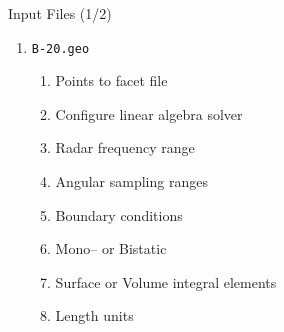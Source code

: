 
\begin{frame}{Input Files (1/2)}
    \begin{enumerate}
        \item \texttt{B-20.geo}
        \begin{enumerate}
            \item Points to facet file
            \item Configure linear algebra solver
            \item Radar frequency range
            \item Angular sampling ranges
            \item Boundary conditions
            \item Mono-- or Bistatic
            \item Surface or Volume integral elements
            \item Length units
        \end{enumerate}
    \end{enumerate}
\end{frame}

